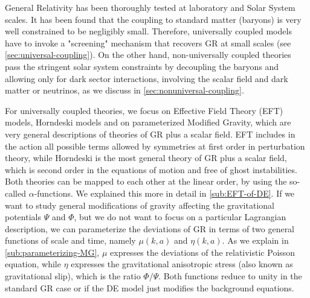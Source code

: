 General Relativity has been thoroughly tested at laboratory and Solar System scales. It has been found that the
coupling to standard matter (baryons) is very well constrained to be negligibly small.
Therefore, universally coupled models have to invoke a "screening" mechanism that recovers GR at small scales (see \cref{sec:universal-coupling}).
On the other hand, non-universally coupled theories pass the stringent solar system constraints by decoupling the baryons
and allowing only for dark sector interactions, involving the scalar field and dark matter or neutrinos, as we discuss in \cref{sec:nonuniversal-coupling}.

For universally coupled theories, we focus on Effective Field Theory (EFT) models, Horndeski models and on parameterized Modified Gravity, which
are very general descriptions of theories of GR plus a scalar field.
EFT includes in the action all possible terms allowed by symmetries at first order in perturbation theory, while Horndeski is the most general theory
of GR plus a scalar field, which is second order in the equations of motion and free of ghost instabilities.
Both theories can be mapped to each other at the linear order, by using the so-called $\alpha$-functions.
We explained this more in detail in \cref{sub:EFT-of-DE}.
If we want to study general modifications of gravity affecting the gravitational potentials $\Psi$ and $\Phi$, but we do not want to focus on a particular Lagrangian description, we can parameterize the deviations of GR in terms of two
general functions of scale and time, namely $\mu(k,a)$ and $\eta(k,a)$. As we explain in \cref{sub:parameterizing-MG}, $\mu$ expresses the deviations of the relativistic Poisson equation, while $\eta$
expresses the gravitational anisotropic stress (also known as gravitational slip), which is the ratio $\Phi/\Psi$.
Both functions reduce to unity in the standard GR case or if the DE model just modifies the background equations.

